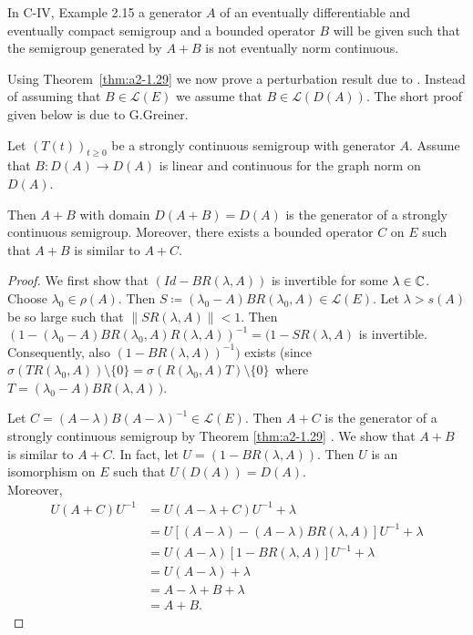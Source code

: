 In C-IV, Example 2.15 a generator $A$ of an eventually differentiable and eventually compact semigroup and a bounded operator $B$ will be given such that the semigroup generated by $A+B$ is not eventually norm continuous.

Using Theorem~\ref{thm:a2-1.29}   we now prove a perturbation result due to \newline \citet{deschschappacher:1984}.
Instead of assuming that $B \in \mathcal{L}(E)$ we assume that $B \in \mathcal{L}(D(A))$.
The short proof given below is due to G.Greiner.

\begin{theorem}\label{thm:a2-1.31}
Let $(T(t))_{t \geq 0}$ be a strongly continuous semigroup with generator $A$.
Assume that $B \colon D(A) \to D(A)$ is linear and continuous for the graph norm on $D(A)$.

Then $A + B$ with domain $D(A + B) = D(A)$ is the generator of a strongly continuous semigroup.
Moreover, there exists a bounded operator $C$ on $E$ such that $A + B$ is similar to $A + C$.
\end{theorem}
\begin{proof}
We first show that $(Id - BR(\lambda,A))$ is invertible for some $\lambda \in \mathbb{C}$.
Choose $\lambda_{0} \in \rho(A)$.
Then $S \coloneqq (\lambda_{0}-A)BR(\lambda_{0},A) \in \mathcal{L}(E)$.
Let $\lambda > s(A)$ be so large such that $\|SR(\lambda,A)\| < 1$.
Then $(1 - (\lambda_{0} - A)BR(\lambda_{0},A)R(\lambda,A))^{-1} = (1 - SR(\lambda,A)$ is invertible.
Consequently, also $(1 -BR(\lambda,A))^{-1})$ exists
(since $\sigma(TR(\lambda_{0},A)) \setminus \{0\} 
= \sigma(R(\lambda_{0},A)T) \setminus \{0\}$\, where \,$T = (\lambda_{0}-A)BR(\lambda,A)\, )$.

Let $C = (A-\lambda)B(A-\lambda)^{-1} \in \mathcal{L}(E)$.
Then $A + C$ is the generator of a strongly continuous semigroup by Theorem \ref{thm:a2-1.29} . 
We show that $A + B$ is similar to $A + C$.
In fact, let $U = (1 - BR(\lambda,A))$.
Then $U$ is an isomorphism on $E$ such that $U(D(A)) = D(A)$. \\
Moreover,
\begin{align*}		
U(A+C)U^{-1} &= U(A - \lambda+C)U^{-1} + \lambda \\
&= U[(A - \lambda) - (A-\lambda)BR(\lambda,A)]U^{-1} + \lambda \\
&= U(A - \lambda)[1 - BR(\lambda,A)]U^{-1} + \lambda \\
&= U(A - \lambda) + \lambda \\
&= A - \lambda + B + \lambda \\
&= A + B.	
\end{align*}
\end{proof}
